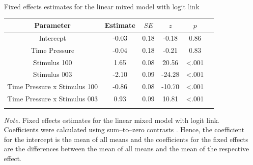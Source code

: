 \documentclass[a4paper,man,natbib]{apa6}
\begin{document}
\begin{center}
\begin{threeparttable}
\caption{Fixed effects estimates for the linear mixed model with logit link}
\label{tab:estimates}
\begin{tabular*}{\textwidth}{c @{\extracolsep{\fill}} ccccc}
\toprule
\multicolumn{1}{c}{Parameter} & \multicolumn{1}{c}{Estimate} & \multicolumn{1}{c}{$SE$} & \multicolumn{1}{c}{$z$} & \multicolumn{1}{c}{$p$}\\
\midrule
\addlinespace
Intercept & -0.03 & 0.18 & -0.18 & 0.86\\
Time Pressure & -0.04 & 0.18 & -0.21 & 0.83\\
Stimulus 100 & 1.65 & 0.08 & 20.56 & <.001\\
Stimulus 003 & -2.10 & 0.09 & -24.28 & <.001\\
Time Pressure x Stimulus 100 & -0.86 & 0.08 & -10.70 & <.001\\
Time Pressure x Stimulus 003 & 0.93 & 0.09 & 10.81 & <.001\\
\bottomrule
\addlinespace
\end{tabular*}
\begin{tablenotes}[para]
\textit{Note.} Fixed effects estimates for the linear mixed model with logit link. Coefficients were calculated using sum--to--zero contrasts \citep{singmann2017introduction}. Hence, the coefficient for the intercept is the mean of all means and the coefficients for the fixed effects are the differences between the mean of all means and the mean of the respective effect.
\end{tablenotes}
\end{threeparttable}
\end{center}
\vspace{8mm}
\end{document}
